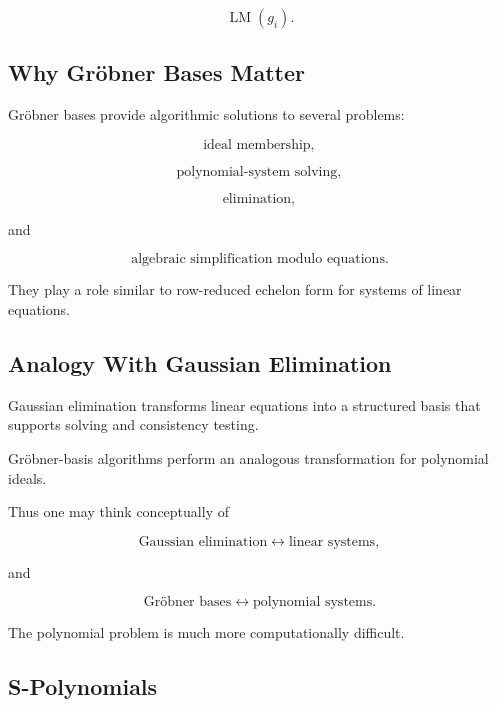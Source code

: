 \[
\operatorname{LM}(g_i).
\]

\subsection{Why Gröbner Bases Matter}
\label{subsec:why-groebner-bases}

Gröbner bases provide algorithmic solutions to several problems:

\[
\boxed{
\text{ideal membership},
}
\]

\[
\boxed{
\text{polynomial-system solving},
}
\]

\[
\boxed{
\text{elimination},
}
\]

and

\[
\boxed{
\text{algebraic simplification modulo equations}.
}
\]

They play a role similar to row-reduced echelon form for systems of linear
equations.

\subsection{Analogy With Gaussian Elimination}
\label{subsec:groebner-gaussian-analogy}

Gaussian elimination transforms linear equations into a structured basis
that supports solving and consistency testing.

Gröbner-basis algorithms perform an analogous transformation for
polynomial ideals.

Thus one may think conceptually of

\[
\boxed{
\text{Gaussian elimination}
\leftrightarrow
\text{linear systems},
}
\]

and

\[
\boxed{
\text{Gröbner bases}
\leftrightarrow
\text{polynomial systems}.
}
\]

The polynomial problem is much more computationally difficult.

\subsection{S-Polynomials}
\label{subsec:s-polynomials}

